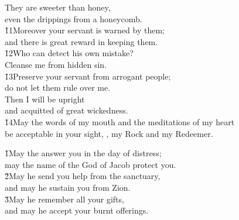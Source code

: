 \begin{poetry}
\poeml They are sweeter than honey, \\
\poemll    even the drippings from a honeycomb. \\
\poeml \v{11}Moreover your servant is warned by them; \\
\poemll    and there is great reward in keeping them. \\
\poeml \v{12}Who can detect his own mistake? \\
\poemll    Cleanse me from hidden sin. \\
\poeml \v{13}Preserve your servant from arrogant people; \\
\poemll    do not let them rule over me. \\
\poeml Then I will be upright \\
\poemll    and acquitted of great wickedness. \\
\poeml \v{14}May the words of my mouth and the meditations of my heart \\
\poemll    be acceptable in your sight, , my Rock and my Redeemer.
\end{poetry}

\begin{poetry}
\poeml \v{1}May the  answer you in the day of distress; \\
\poemll    may the name of the God of Jacob protect you. \\
\poeml \v{2}May he send you help from the sanctuary, \\
\poemll    and may he sustain you from Zion. \\
\poeml \v{3}May he remember all your gifts, \\
\poemll    and may he accept your burnt offerings.
\end{poetry}

